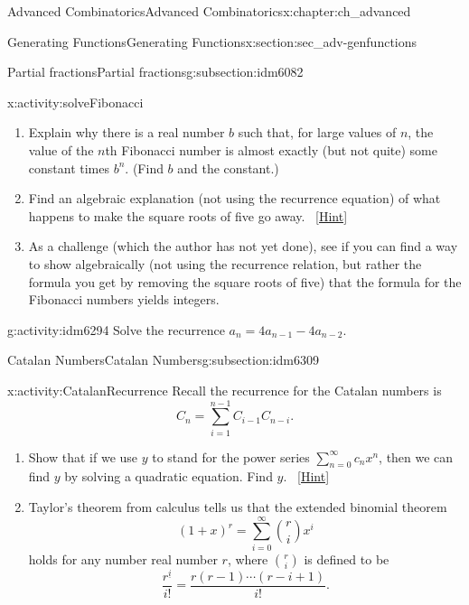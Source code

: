 \documentclass[oneside,10pt,]{book}
\numberwithin{equation}{chapter}
\begin{document}
\begin{chapterptx}{Advanced Combinatorics}{}{Advanced Combinatorics}{}{}{x:chapter:ch_advanced}
\begin{sectionptx}{Generating Functions}{}{Generating Functions}{}{}{x:section:sec_adv-genfunctions}
\begin{subsectionptx}{Partial fractions}{}{Partial fractions}{}{}{g:subsection:idm6082}
\begin{activity}{}{x:activity:solveFibonacci}
\begin{enumerate}[font=\bfseries,label=(\alph*),ref=\alph*]
\item{}Explain why there is a real number \(b\) such that, for large values of \(n\), the value of the \(n\)th Fibonacci number is almost exactly (but not quite) some constant times \(b^n\). (Find \(b\) and the constant.)%
\item{}Find an algebraic explanation (not using the recurrence equation) of what happens to make the square roots of five go away.%
\qquad~\hfill{\tiny\hyperlink{g:hint:idm6276-back}{[Hint]}}\item{}As a challenge (which the author has not yet done), see if you can find a way to show algebraically (not using the recurrence relation, but rather the formula you get by removing the square roots of five) that the formula for the Fibonacci numbers yields integers.%
\end{enumerate}
\end{activity}
\begin{activity}{}{g:activity:idm6294}%
Solve the recurrence \(a_n= 4a_{n-1} - 4a_{n-2}\).%
\end{activity}
\end{subsectionptx}
%
%
\typeout{************************************************}
\typeout{************************************************}
%
\begin{subsectionptx}{Catalan Numbers}{}{Catalan Numbers}{}{}{g:subsection:idm6309}
\begin{activity}{}{x:activity:CatalanRecurrence}%
Recall the recurrence for the Catalan numbers is%
\begin{equation*}
C_n = \sum_{i=1}^{n-1} C_{i-1}C_{n-i}\text{.}
\end{equation*}
%
\begin{enumerate}[font=\bfseries,label=(\alph*),ref=\alph*]
\item{}Show that if we use \(y\) to stand for the power series \(\sum_{n=0}^\infty c_nx^n\), then we can find \(y\) by solving a quadratic equation. Find \(y\).%
\qquad~\hfill{\tiny\hyperlink{g:hint:idm6322-back}{[Hint]}}\item{}Taylor's theorem from calculus tells us that the extended binomial theorem%
\begin{equation*}
(1+x)^r = \sum_{i=0}^\infty \binom{r}{i}x^i
\end{equation*}
holds for any number real number \(r\), where \(\binom{r}{i}\) is defined to be%
\begin{equation*}
\frac{r^{\underline{i}}}{i!} = \frac{r(r-1)\cdots(r-i+1)}{i!}\text{.}

\end{equation*}
\end{enumerate}
\end{activity}
\end{subsectionptx}
\end{sectionptx}
\end{chapterptx}
\end{document}
